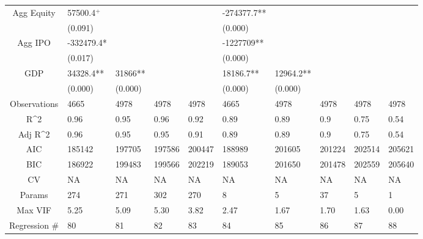 \documentclass{article}
\begin{document}
\begin{table}[H]
\begin{tabular}{|clllllllll|}
  Agg Equity & 57500.4$^{+}$ &  &  &  & -274377.7** &  &  &  &  \\ 
   & (0.091) &  &  &  & (0.000) &  &  &  &  \\ 
  Agg IPO & -332479.4* &  &  &  & -1227709** &  &  &  &  \\ 
   & (0.017) &  &  &  & (0.000) &  &  &  &  \\ 
  GDP & 34328.4** & 31866** &  &  & 18186.7** & 12964.2** &  &  &  \\ 
   & (0.000) & (0.000) &  &  & (0.000) & (0.000) &  &  &  \\ 
  \hline 
 Observations & 4665 & 4978 & 4978 & 4978 & 4665 & 4978 & 4978 & 4978 & 4978 \\ 
  R^2 & 0.96 & 0.95 & 0.96 & 0.92 & 0.89 & 0.89 & 0.9 & 0.75 & 0.54 \\ 
  Adj R^2 & 0.96 & 0.95 & 0.95 & 0.91 & 0.89 & 0.89 & 0.9 & 0.75 & 0.54 \\ 
  AIC & 185142 & 197705 & 197586 & 200447 & 188989 & 201605 & 201224 & 202514 & 205621 \\ 
  BIC & 186922 & 199483 & 199566 & 202219 & 189053 & 201650 & 201478 & 202559 & 205640 \\ 
  CV & NA & NA & NA & NA & NA & NA & NA & NA & NA \\ 
  Params & 274 & 271 & 302 & 270 & 8 & 5 & 37 & 5 & 1 \\ 
  Max VIF & 5.25 & 5.09 & 5.30 & 3.82 & 2.47 & 1.67 & 1.70 & 1.63 & 0.00 \\ 
  Regression \# & 80 & 81 & 82 & 83 & 84 & 85 & 86 & 87 & 88 \\ 
   \hline
\end{tabular}
 
\end{table}
\end{document}
